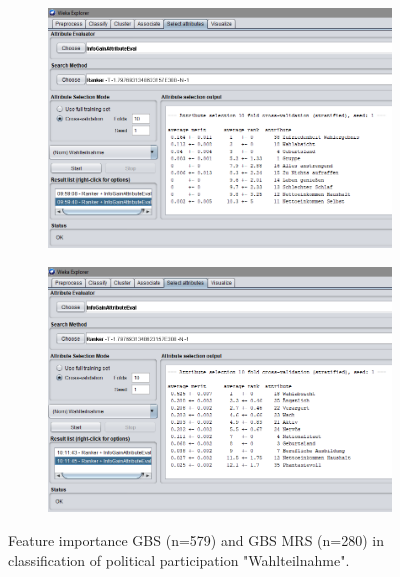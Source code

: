 \begin{figure}
\centering
\begin{subfigure}[b]{0.8\textwidth}
		\includegraphics[scale=0.55,angle=0]{fig/weka_gbs}
   \label{fig:Ng1} 
\end{subfigure}

\begin{subfigure}[b]{0.8\textwidth}
\vspace{0.55cm}
		\includegraphics[scale=0.55,angle=0]{fig/weka_gesis}
   \label{fig:Ng2}
\end{subfigure}
\vspace{0.35cm}
\caption{Feature importance GBS (n=579) and GBS MRS (n=280) in classification of political participation "Wahlteilnahme".}
\end{figure}

